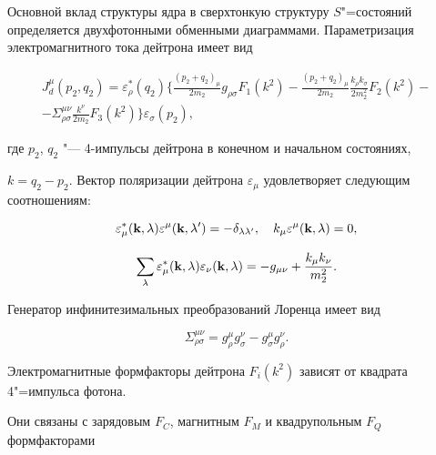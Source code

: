 Основной вклад структуры ядра в сверхтонкую структуру $S$"=состояний определяется двухфотонными обменными диаграммами. Параметризация \linebreak электромагнитного тока дейтрона имеет вид

\begin{multline}

J^\mu_d(p_2,q_2)=\varepsilon^\ast_\rho(q_2)\Biggl\{\frac{(p_2+q_2)_\mu}

{2m_2}g_{\rho\sigma}F_1(k^2)

-\frac{(p_2+q_2)_\mu}{2m_2}\frac{k_\rho k_\sigma}{2m_2^2}F_2(k^2)-

\\

-\Sigma^{\mu\nu}_{\rho\sigma}\frac{k^\nu}{2m_2}F_3(k^2)\Biggr\}\varepsilon_\sigma(p_2),

\end{multline}

где $p_2$, $q_2$ "--- 4-импульсы дейтрона в конечном и начальном состояниях,

$k=q_2-p_2$. Вектор поляризации дейтрона $\varepsilon_\mu$ удовлетворяет следующим соотношениям:

\begin{equation}

\varepsilon^\ast_\mu({\bf k},\lambda)\varepsilon^\mu({\bf k},\lambda')=-

\delta_{\lambda\lambda'},~~~ k_\mu\varepsilon^\mu({\bf k},\lambda)=0,

\end{equation}

\begin{displaymath}

\sum_\lambda\varepsilon^\ast_\mu({\bf k},\lambda)\varepsilon_\nu({\bf k},\lambda)=

-g_{\mu\nu}+\frac{k_\mu k_\nu}{m_2^2}.

\end{displaymath}

Генератор инфинитезимальных преобразований Лоренца имеет вид

\begin{equation}

\Sigma^{\mu\nu}_{\rho\sigma}=g^\mu_\rho g^\nu_\sigma-g^\mu_\sigma g^\nu_\rho.

\end{equation}

Электромагнитные формфакторы дейтрона $F_i(k^2)$ зависят от квадрата 4"=импульса фотона.

Они связаны с зарядовым $F_C$, магнитным $F_M$ и квадрупольным $F_Q$ формфакторами


